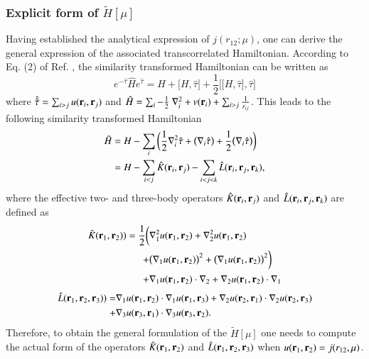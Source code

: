 \documentclass[aip,jcp,reprint,noshowkeys,superscriptaddress]{revtex4-1}
\newcommand{\br}[0]{{\bf {r}}}
\newcommand{\bri}[1]{{\bf r}_{#1}}
\begin{document}
\subsubsection{Explicit form of $\tilde{H}[\mu]$ }
Having established the analytical expression of $j(r_{12};\mu)$, one can derive the general expression of the associated transcorrelated Hamiltonian.  
According to Eq. (2) of Ref. , the similarity transformed Hamiltonian can be written as 
\begin{equation}
 \label{ht_def_g}
 e^{-\hat{\tau}} \hat{H} e^{\hat{\tau}} = H + \big[ H,\hat{\tau} \big] + \frac{1}{2}\bigg[ \big[H,\hat{\tau}\big],\hat{\tau}\bigg]
\end{equation}
where $\hat{\hat{\tau}} = \sum_{i>j}u(\br{}_i,\br{}_j)$ and $\hat{H} = \sum_i -\frac{1}{2} \nabla^2_i + v(\br{}_i) + \sum_{i>j} \frac{1}{r_{ij}}$. 
This leads to the following similarity transformed Hamiltonian 
\begin{equation}
 \begin{aligned}
 \label{ht_def_gu}
 \tilde{H} & = H - \sum_i \bigg( \frac{1}{2} \nabla_i^2 \hat{\tau} + \big(\nabla_i \hat{\tau} \big) + \frac{1}{2} \big(\nabla_i \hat{\tau} \big)  \bigg) \\
           & = H - \sum_{i<j} \hat{K}(\bri{i},\bri{j}) - \sum_{i<j<k} \hat{L}(\bri{i},\bri{j},\bri{k}),
 \end{aligned}
\end{equation}
where the effective two- and three-body operators $\hat{K}(\bri{i},\bri{j})$ and $\hat{L}(\bri{i},\bri{j},\bri{k})$ are defined as
\begin{equation}
 \begin{aligned}
 \label{def_k}
  \hat{K}(\bri{1},\bri{2}) ) = \frac{1}{2} \bigg( &\nabla_1^2 u(\bri{1},\bri{2}) + \nabla_2^2u(\bri{1},\bri{2}) \\
                                               + &\big(\nabla_1 u(\bri{1},\bri{2}) \big) ^2 + \big(\nabla_1 u(\bri{1},\bri{2}) \big) ^2 \bigg) \\
                                               + &\nabla_1 u(\bri{1},\bri{2}) \cdot \nabla_2 + \nabla_2 u(\bri{1},\bri{2}) \cdot \nabla_1  \\
 \end{aligned}
\end{equation}
\begin{equation}
 \begin{aligned}
 \label{def_k}
  \hat{L}(\bri{1},\bri{2},\bri{3}) ) = & \nabla_1 u(\bri{1},\bri{2}) \cdot \nabla_1 u(\bri{1},\bri{3}) + \nabla_2 u(\bri{2},\bri{1}) \cdot \nabla_2 u(\bri{2},\bri{3})  \\
                                     + & \nabla_3 u(\bri{3},\bri{1}) \cdot \nabla_3 u(\bri{3},\bri{2}).
 \end{aligned}
\end{equation}
Therefore, to obtain the general formulation of the $\tilde{H}[\mu]$ one needs to compute the actual form of the operators $\hat{K}(\bri{1},\bri{2})$ and $\hat{L}(\bri{1},\bri{2},\bri{3})$ when $u(\bri{1},\bri{2}) = j(r_{12},\mu)$. 
\end{document}
